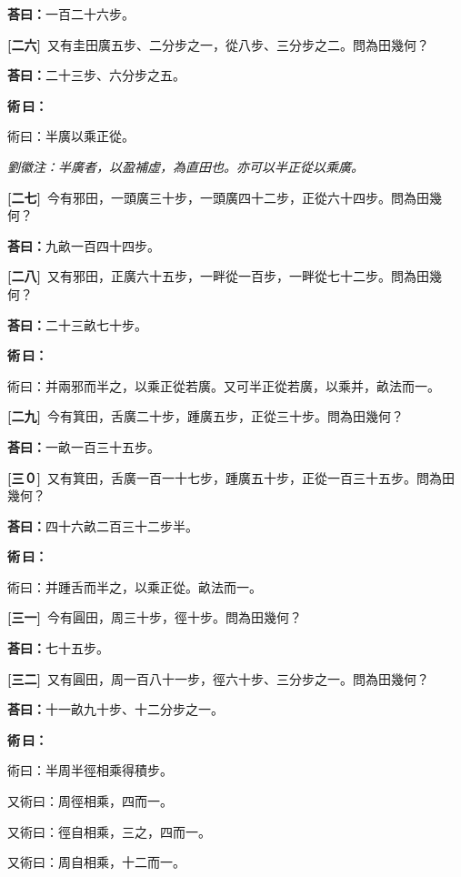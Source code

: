 \documentclass[11pt,a4paper]{article}
\newenvironment{method}{%
  \par\noindent\textcolor{methodcolor}{\textbf{術\,曰：}}%
  \ignorespaces
}{\par\vspace{0.5em}}
\newcommand{\problemnum}[1]{\textbf{[\ignorespaces#1\unskip]}}
\begin{document}
\noindent\textcolor{answercolor}{\textbf{荅曰：}}一百二十六步。

\noindent\problemnum{二六}\,
又有圭田廣五步、二分步之一，從八步、三分步之二。問為田幾何？

\noindent\textcolor{answercolor}{\textbf{荅曰：}}二十三步、六分步之五。

\begin{method}
術曰：半廣以乘正從。
\end{method}

\noindent\textit{劉徽注：半廣者，以盈補虛，為直田也。亦可以半正從以乘廣。}

\noindent\problemnum{二七}\,
今有邪田，一頭廣三十步，一頭廣四十二步，正從六十四步。問為田幾何？

\noindent\textcolor{answercolor}{\textbf{荅曰：}}九畝一百四十四步。

\noindent\problemnum{二八}\,
又有邪田，正廣六十五步，一畔從一百步，一畔從七十二步。問為田幾何？

\noindent\textcolor{answercolor}{\textbf{荅曰：}}二十三畝七十步。

\begin{method}
術曰：并兩邪而半之，以乘正從若廣。又可半正從若廣，以乘并，畝法而一。
\end{method}

\noindent\problemnum{二九}\,
今有箕田，舌廣二十步，踵廣五步，正從三十步。問為田幾何？

\noindent\textcolor{answercolor}{\textbf{荅曰：}}一畝一百三十五步。

\noindent\problemnum{三０}\,
又有箕田，舌廣一百一十七步，踵廣五十步，正從一百三十五步。問為田幾何？

\noindent\textcolor{answercolor}{\textbf{荅曰：}}四十六畝二百三十二步半。

\begin{method}
術曰：并踵舌而半之，以乘正從。畝法而一。
\end{method}

\noindent\problemnum{三一}\,
今有圓田，周三十步，徑十步。問為田幾何？

\noindent\textcolor{answercolor}{\textbf{荅曰：}}七十五步。

\noindent\problemnum{三二}\,
又有圓田，周一百八十一步，徑六十步、三分步之一。問為田幾何？

\noindent\textcolor{answercolor}{\textbf{荅曰：}}十一畝九十步、十二分步之一。

\begin{method}
術曰：半周半徑相乘得積步。

又術曰：周徑相乘，四而一。

又術曰：徑自相乘，三之，四而一。

又術曰：周自相乘，十二而一。
\end{method}
\end{document}
